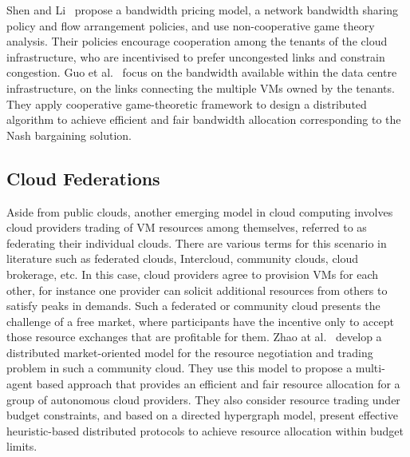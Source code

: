 Shen and Li~\cite{Shen2014NewBandwidth} propose a bandwidth pricing model, 
a network bandwidth sharing policy and flow arrangement policies, 
and use non-cooperative game theory analysis.
Their policies encourage cooperation among the tenants of the cloud infrastructure, 
who are incentivised to prefer uncongested links and constrain congestion.
%
Guo et al.~\cite{Guo2013} focus on the bandwidth available within the data centre infrastructure, 
on the links connecting the multiple VMs owned by the tenants.
They apply cooperative game-theoretic framework to design a distributed algorithm 
to achieve efficient and fair bandwidth allocation corresponding to the Nash bargaining solution.


\subsection{Cloud Federations}
\label{sec__related_work_cloud_fed}

Aside from public clouds, another emerging model in cloud computing involves 
cloud providers trading of VM resources among themselves, 
referred to as federating their individual clouds.
There are various terms for this scenario in literature 
such as federated clouds, Intercloud, community clouds, cloud brokerage, etc. 
In this case, cloud providers agree to provision VMs for each other, 
for instance one provider can solicit additional resources from others to satisfy peaks in demands.
Such a federated or community cloud presents the challenge of a free market,
where participants have the incentive only to accept 
those resource exchanges that are profitable for them. %
Zhao at al.~\cite{Zhao2014} develop a distributed market-oriented model for 
the resource negotiation and trading problem in such a community cloud.
They use this model to propose a multi-agent based approach 
that provides an efficient and fair resource allocation for a group of autonomous cloud providers.
They also consider resource trading under budget constraints, 
and based on a directed hypergraph model, present effective heuristic-based distributed protocols to achieve resource allocation within budget limits.

